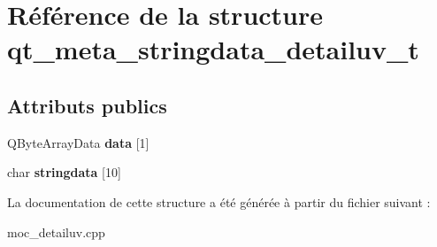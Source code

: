 \hypertarget{structqt__meta__stringdata__detailuv__t}{\section{Référence de la structure qt\+\_\+meta\+\_\+stringdata\+\_\+detailuv\+\_\+t}
\label{structqt__meta__stringdata__detailuv__t}
}
\subsection*{Attributs publics}
\begin{DoxyCompactItemize}
\item 
\hypertarget{structqt__meta__stringdata__detailuv__t_a79bd25ae054fe9d5115c1bae9e037ea9}{Q\+Byte\+Array\+Data {\bfseries data} \mbox{[}1\mbox{]}}\label{structqt__meta__stringdata__detailuv__t_a79bd25ae054fe9d5115c1bae9e037ea9}

\item 
\hypertarget{structqt__meta__stringdata__detailuv__t_adad5b2e6666f20c530592ddc9b43800e}{char {\bfseries stringdata} \mbox{[}10\mbox{]}}\label{structqt__meta__stringdata__detailuv__t_adad5b2e6666f20c530592ddc9b43800e}

\end{DoxyCompactItemize}


La documentation de cette structure a été générée à partir du fichier suivant \+:\begin{DoxyCompactItemize}
\item 
moc\+\_\+detailuv.\+cpp\end{DoxyCompactItemize}
